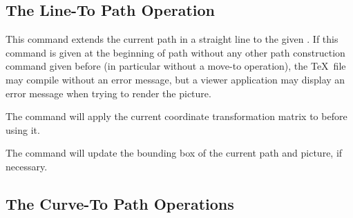 \subsection{The Line-To Path Operation}

\begin{command}{\pgfpathlineto{}}
  This command extends the current path in a straight line to the
  given . If this command is given at the beginning
  of path without any other path construction command given before (in
  particular without a move-to operation), the \TeX\ file may compile
  without an error message, but a viewer application may display an
  error message when trying to render the picture.
\begin{codeexample}[]
\begin{pgfpicture}
  \pgfpathmoveto{\pgfpointorigin}
  \pgfpathlineto{\pgfpoint{1cm}{1cm}}
  \pgfpathlineto{\pgfpoint{2cm}{1cm}}
\end{pgfpicture}
\end{codeexample}
  The command will apply the current coordinate transformation matrix
  to  before using it.

  The command will update the bounding box of the current path and
  picture, if necessary.
\end{command}


\subsection{The Curve-To Path Operations}

